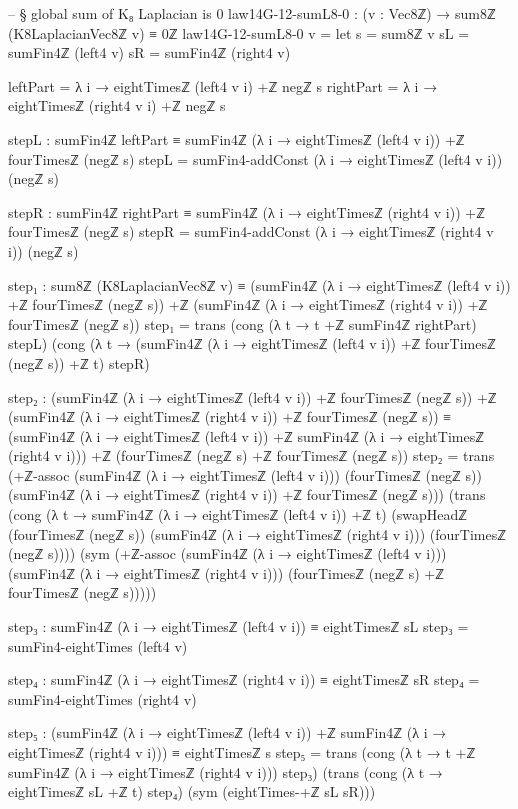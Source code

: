 \documentclass[11pt,a4paper]{book}
\begin{document}
\begin{code}
-- § global sum of K₈ Laplacian is 0
law14G-12-sumL8-0 : (v : Vec8ℤ) → sum8ℤ (K8LaplacianVec8ℤ v) ≡ 0ℤ
law14G-12-sumL8-0 v =
  let
    s  = sum8ℤ v
    sL = sumFin4ℤ (left4 v)
    sR = sumFin4ℤ (right4 v)

    leftPart  = λ i → eightTimesℤ (left4 v i) +ℤ negℤ s
    rightPart = λ i → eightTimesℤ (right4 v i) +ℤ negℤ s

    stepL : sumFin4ℤ leftPart ≡ sumFin4ℤ (λ i → eightTimesℤ (left4 v i)) +ℤ fourTimesℤ (negℤ s)
    stepL = sumFin4-addConst (λ i → eightTimesℤ (left4 v i)) (negℤ s)

    stepR : sumFin4ℤ rightPart ≡ sumFin4ℤ (λ i → eightTimesℤ (right4 v i)) +ℤ fourTimesℤ (negℤ s)
    stepR = sumFin4-addConst (λ i → eightTimesℤ (right4 v i)) (negℤ s)

    step₁ : sum8ℤ (K8LaplacianVec8ℤ v) ≡
            (sumFin4ℤ (λ i → eightTimesℤ (left4 v i)) +ℤ fourTimesℤ (negℤ s)) +ℤ
            (sumFin4ℤ (λ i → eightTimesℤ (right4 v i)) +ℤ fourTimesℤ (negℤ s))
    step₁ =
      trans
        (cong (λ t → t +ℤ sumFin4ℤ rightPart) stepL)
        (cong (λ t → (sumFin4ℤ (λ i → eightTimesℤ (left4 v i)) +ℤ fourTimesℤ (negℤ s)) +ℤ t) stepR)

    step₂ : (sumFin4ℤ (λ i → eightTimesℤ (left4 v i)) +ℤ fourTimesℤ (negℤ s)) +ℤ
            (sumFin4ℤ (λ i → eightTimesℤ (right4 v i)) +ℤ fourTimesℤ (negℤ s)) ≡
            (sumFin4ℤ (λ i → eightTimesℤ (left4 v i)) +ℤ sumFin4ℤ (λ i → eightTimesℤ (right4 v i))) +ℤ
            (fourTimesℤ (negℤ s) +ℤ fourTimesℤ (negℤ s))
    step₂ =
      trans
        (+ℤ-assoc (sumFin4ℤ (λ i → eightTimesℤ (left4 v i))) (fourTimesℤ (negℤ s))
                 (sumFin4ℤ (λ i → eightTimesℤ (right4 v i)) +ℤ fourTimesℤ (negℤ s)))
        (trans
          (cong (λ t → sumFin4ℤ (λ i → eightTimesℤ (left4 v i)) +ℤ t)
                (swapHeadℤ (fourTimesℤ (negℤ s)) (sumFin4ℤ (λ i → eightTimesℤ (right4 v i)))
                           (fourTimesℤ (negℤ s))))
          (sym (+ℤ-assoc (sumFin4ℤ (λ i → eightTimesℤ (left4 v i)))
                         (sumFin4ℤ (λ i → eightTimesℤ (right4 v i)))
                         (fourTimesℤ (negℤ s) +ℤ fourTimesℤ (negℤ s)))))

    step₃ : sumFin4ℤ (λ i → eightTimesℤ (left4 v i)) ≡ eightTimesℤ sL
    step₃ = sumFin4-eightTimes (left4 v)

    step₄ : sumFin4ℤ (λ i → eightTimesℤ (right4 v i)) ≡ eightTimesℤ sR
    step₄ = sumFin4-eightTimes (right4 v)

    step₅ : (sumFin4ℤ (λ i → eightTimesℤ (left4 v i)) +ℤ sumFin4ℤ (λ i → eightTimesℤ (right4 v i))) ≡
            eightTimesℤ s
    step₅ =
      trans
        (cong (λ t → t +ℤ sumFin4ℤ (λ i → eightTimesℤ (right4 v i))) step₃)
        (trans
          (cong (λ t → eightTimesℤ sL +ℤ t) step₄)
          (sym (eightTimes-+ℤ sL sR)))


\end{code}
\end{document}
